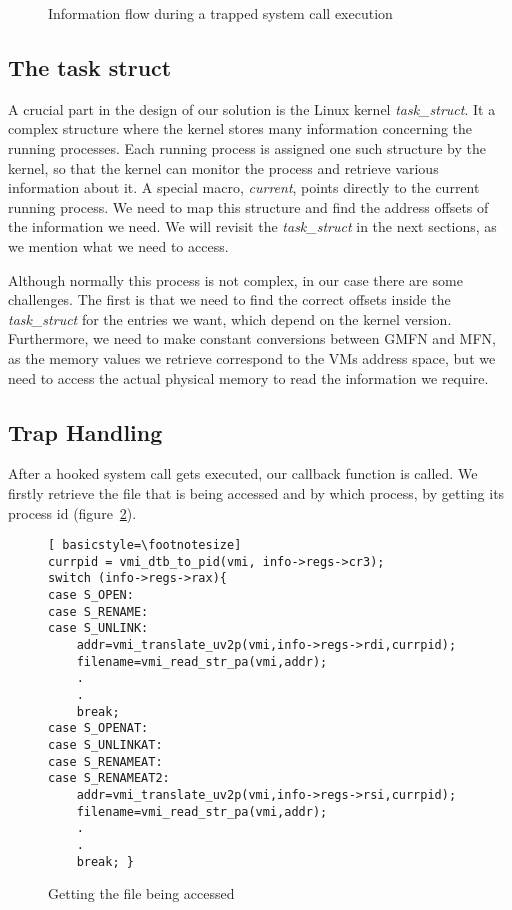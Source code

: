 \begin{figure}[ht]
	\centering
	
	\caption{Information flow during a trapped system call execution}
	\label{fig:overview}
\end{figure}


\subsection{The task struct}\label{sub:struct}
A crucial part in the design of our solution is the Linux kernel \textit{task\_struct}. It a complex structure where the kernel stores many information concerning the running processes. Each running process is assigned one such structure by the kernel, so that the kernel can monitor the process and retrieve various information about it. A special macro, \textit{current}, points directly to the current running process. We need to map this structure and find the address offsets of the information we need. We will revisit the \textit{task\_struct} in the next sections, as we mention what we need to access.

\par Although normally this process is not complex, in our case there are some challenges. The first is that we need to find the correct offsets inside the \textit{task\_struct} for the entries we want, which depend on the kernel version. Furthermore, we need to make constant conversions between \ac{GMFN} and \ac{MFN}, as the memory values we retrieve correspond to the \ac{VM}s address space, but we need to access the actual physical memory to read the information we require.


\subsection{Trap Handling}\label{sub:handling}

After a hooked system call gets executed, our callback function is called. We firstly retrieve the file that is being accessed and by which process, by getting its process id (figure~\ref{fig:getfile}). 

\begin{figure}[ht]
	\centering
	\begin{lstlisting}[ basicstyle=\footnotesize]
currpid = vmi_dtb_to_pid(vmi, info->regs->cr3);
switch (info->regs->rax){
case S_OPEN:
case S_RENAME:
case S_UNLINK:
	addr=vmi_translate_uv2p(vmi,info->regs->rdi,currpid);
	filename=vmi_read_str_pa(vmi,addr);
	.
	.
	break;
case S_OPENAT:
case S_UNLINKAT:
case S_RENAMEAT:
case S_RENAMEAT2:
	addr=vmi_translate_uv2p(vmi,info->regs->rsi,currpid);
	filename=vmi_read_str_pa(vmi,addr);
	.
	.
	break; }
	\end{lstlisting}
	\caption{Getting the file being accessed}
	\label{fig:getfile}
\end{figure}


